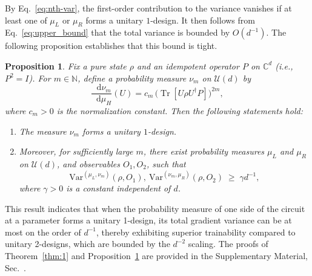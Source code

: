 \documentclass[%
 superscriptaddress,
 aps,prl,
 reprint,
 twocolumn,
 amsmath,amssymb,showpacs,
 bibnotes,
]{revtex4-2}
\newtheorem{proposition}{Proposition}
\newcommand{\RomanNumeralCaps}[1]
    {\MakeUppercase{\romannumeral #1}}
\newcommand*{\dif}{\mathop{}\!\mathrm{d}}
\begin{document}
By Eq.~\eqref{eq:nth-var}, the first-order contribution to the variance vanishes if at least one of $\mu_L$ or $\mu_R$ forms a unitary $1$-design. It then follows from Eq.~\eqref{eq:upper_bound} that the total variance is bounded by $O(d^{-1})$. The following proposition establishes that this bound is tight.
\begin{proposition}
   Fix a pure state $\rho$ and an idempotent operator $P$ on $\mathbb{C}^d$ (i.e., $P^2 = I$). For $m \in \mathbb{N}$, define a probability measure $\nu_m$ on $\mathcal{U}(d)$ by
\begin{equation}
    \frac{\dif \nu_m}{\dif \mu_H}(U)
    = c_m \, \bigl(\operatorname{Tr}[U \rho U^\dagger P]\bigr)^{2m},
    \label{eq:1-design}
\end{equation}
where $c_m > 0$ is the normalization constant. Then the following statements hold:
\begin{enumerate}
    \item The measure $\nu_m$ forms a unitary $1$-design.
    \item Moreover, for sufficiently large $m$, there exist probability measures $\mu_L$ and $\mu_R$ on $\mathcal{U}(d)$, and observables $O_1, O_2$, such that
    \begin{equation}
        \mathrm{Var}^{(\mu_L, \nu_m)}(\rho, O_1),\ \mathrm{Var}^{(\nu_m, \mu_R)}(\rho, O_2)\;\geq\; \gamma d^{-1},
    \end{equation}
    where $\gamma > 0$ is a constant independent of $d$.
\end{enumerate}
\label{prop:1-design}
\end{proposition}
This result indicates that when the probability measure of one side of the circuit at a parameter forms a unitary 1-design, its total gradient variance can be at most on the order of \(d^{-1}\), thereby exhibiting superior trainability compared to unitary 2-designs, which are bounded by the $d^{-2}$ scaling. The proofs of Theorem~\ref{thm:1} and Proposition~\ref{prop:1-design} are provided in the Supplementary Material, Sec.~\RomanNumeralCaps{4}.
\end{document}
